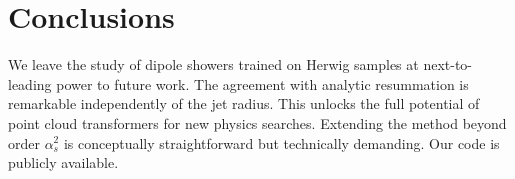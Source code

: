 \section{Conclusions}\label{sec:conclusions}

We leave the study of dipole showers trained on Herwig samples at
next-to-leading power to future work. The agreement with analytic
resummation is remarkable independently of the jet radius. This unlocks
the full potential of point cloud transformers for new physics searches.
Extending the method beyond order $\alpha_s^2$ is conceptually
straightforward but technically demanding. Our code is publicly
available.

